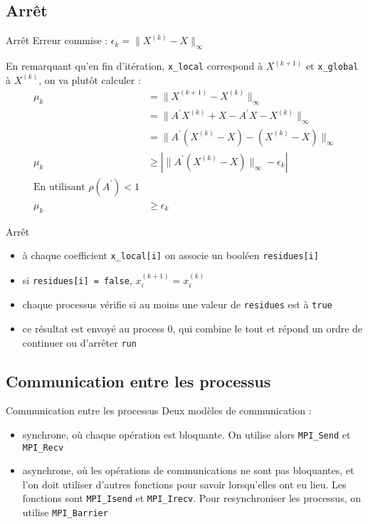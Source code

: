 \documentclass{beamer}
\begin{document}
\subsection{Arrêt}

\begin{frame}{Arrêt}
Erreur commise : \(\epsilon_k = \|X^{(k)} - X \|_\infty\)

En remarquant qu'en fin d'itération, \lstinline{x_local} correspond à \(X^{(k+1)}\) et \lstinline{x_global} à \(X^{(k)}\), on va plutôt calculer :
\begin{align*}
    \mu_k &= \| X^{(k+1)} - X^{(k)} \|_\infty \\
    &= \| A^\prime X^{(k)} + X - A^\prime X- X^{(k)} \|_\infty \\
    &= \| A^\prime (X^{(k)} - X) - ( X^{(k)} - X ) \|_\infty \\
    \mu_k &\geq \left| \| A^\prime (X^{(k)} - X) \|_\infty - \epsilon_k \right| \\
    \text{En utilisant } \rho(A^\prime) < 1\\
    \mu_k &\geq \epsilon_k
\end{align*}
\end{frame}


\begin{frame}{Arrêt}

\begin{itemize}
    \item à chaque coefficient
\lstinline{x_local[i]} on associe un booléen \lstinline{residues[i]}
    \item si \lstinline{residues[i] = false}, \(x^{(k+1)}_i = x^{(k)}_i\)
    \item chaque processus vérifie
si au moins une valeur de \lstinline{residues} est à \lstinline{true}
    \item ce résultat est envoyé au process 0, qui combine le tout et répond un ordre de continuer ou d'arrêter \lstinline{run}
\end{itemize}
\end{frame}

\subsection{Communication entre les processus}

\begin{frame}{Communication entre les processus}
Deux modèles de communication :
\begin{itemize}
\item synchrone, où chaque opération est bloquante. On utilise alors \lstinline{MPI_Send} et \lstinline{MPI_Recv}
\item asynchrone, où les opérations
de communications ne sont pas bloquantes, et l'on doit utiliser d'autres fonctions
pour savoir lorsqu'elles ont eu lieu.
Les fonctions sont \lstinline{MPI_Isend} et \lstinline{MPI_Irecv}.
Pour resynchroniser les processus, on utilise \lstinline{MPI_Barrier}
\end{itemize}
\end{frame}
\end{document}
